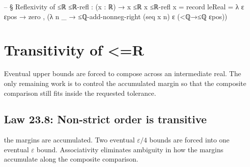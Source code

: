 \documentclass[11pt,a4paper]{book}
\def\mathbb#1{#1}%
\def\texorpdfstring#1#2{#2}%
\begin{document}
\begin{code}
-- § Reflexivity of ≤ℝ
≤ℝ-refl : (x : ℝ) → x ≤ℝ x
≤ℝ-refl x = record
  { leReal = λ ε εpos →
      zero , (λ n _ →
        ≤ℚ-add-nonneg-right (seq x n) ε (<ℚ→≤ℚ εpos))
  }
\end{code}


\section{Transitivity of \texorpdfstring{$\le_{\mathbb{R}}$}{<=R}}

Eventual upper bounds are forced to compose across an intermediate real. The only remaining work is to control the accumulated margin so that the composite comparison still fits inside the requested tolerance.

\subsection*{Law 23.8: Non-strict order is transitive}

the margins are accumulated.
Two eventual $\varepsilon/4$ bounds are forced into one eventual $\varepsilon$ bound. Associativity eliminates ambiguity in how the margins accumulate along the composite comparison.
\end{document}

